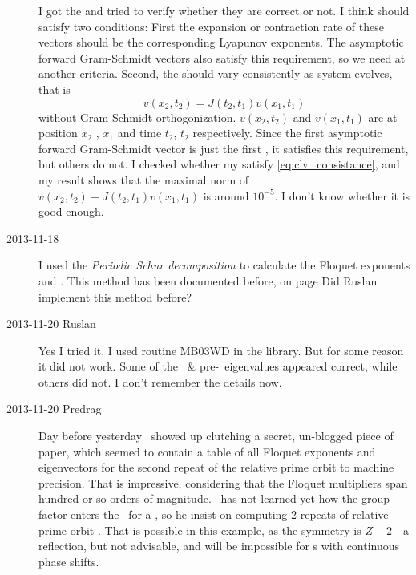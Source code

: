 \begin{description}
I got the {\cLvs} and tried to verify whether they are correct or not.  I
think {\cLvs} should satisfy two conditions: First the expansion or
contraction rate of these vectors should be the corresponding Lyapunov
exponents.  The asymptotic forward Gram-Schmidt vectors also satisfy this
requirement, so we need at another criteria. Second, the {\cLvs} should
vary consistently as system evolves, that is
\begin{equation}
v(x_2, t_2)=J(t_2, t_1)v(x_1, t_1)
\label{eq:clv_consistance}
\end{equation}
without Gram Schmidt orthogonization.  $v(x_2, t_2)$ and  $v(x_1, t_1)$
are {\cLv} at position $x_2$ ,  $x_1$ and time $t_2$, $t_2$
respectively. Since the first asymptotic forward Gram-Schmidt vector is
just the first {\cLv}, it satisfies this requirement, but
others do not.  I checked whether my {\cLvs} satisfy
\ref{eq:clv_consistance}, and my result shows that the maximal norm of
$v(x_2, t_2)-J(t_2, t_1)v(x_1, t_1)$ is around $10^{-5}$. I don't know
whether it is good enough.

\item[2013-11-18 \XD]
I used the \textit{Periodic Schur decomposition}
to calculate the Floquet exponents and {\cLvs}. This method has been
documented before,
on page \pageref{2013-11-18XD}
Did Ruslan implement this method before?

\item[2013-11-20 Ruslan] Yes I tried it. I used routine MB03WD in the
library.  But for some reason it did not work.  Some of the \rpo\ \& pre-\po\
eigenvalues appeared correct, while others did not.  I don't remember the
details now.

\item[2013-11-20 Predrag] Day before yesterday \XD\ showed up
clutching a secret, un-blogged piece of paper, which seemed to contain a
table of all Floquet exponents and eigenvectors for the second repeat of
the relative prime orbit \PO{10.25} to machine precision. That is
impressive, considering that the Floquet multipliers span hundred or so
orders of magnitude. \XD\ has not learned yet how the group factor
enters the \JacobianM\ for a \rpo, so he insist on computing 2 repeats
of relative prime orbit \PO{10.25}. That is possible in this example, as
the symmetry is $Z-2$ - a reflection, but not advisable, and will be
impossible for \rpo s with continuous phase shifts.


\end{description}
